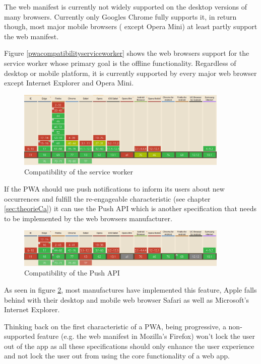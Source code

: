 The web manifest is currently not widely supported on the desktop versions of many browsers. Currently only Googles Chrome fully supports it, in return though, most major mobile browsers ( except Opera Mini) at least partly support the web manifest. 

Figure \ref{pwacompatibilityserviceworker} shows the web browsers support for the service worker whose primary goal is the offline functionality. Regardless of desktop or mobile platform, it is currently supported by every major web browser except Internet Explorer and Opera Mini.

\begin{figure}[htbp] 
	\centering
	\includegraphics[width=0.9\textwidth]{Assets/chapter_pwa/serviceworkersupport.PNG}
	\caption{Compatibility of the service worker}
	\label{fig:pwacompatibilityserviceworker}
\end{figure}

If the PWA should use push notifications to inform its users about new occurrences and fulfill the re-engageable characteristic (see chapter \ref{sec:theorieCa}) it can use the Push API which is another specification that needs to be implemented by the web browsers manufacturer.

\begin{figure}[htbp] 
	\centering
	\includegraphics[width=0.9\textwidth]{Assets/chapter_pwa/pushapisupport.PNG}
	\caption{Compatibility of the Push API}
	\label{fig:pwacompatibilitypushapi}
\end{figure}

As seen in figure \ref{fig:pwacompatibilitypushapi}, most manufactures have implemented this feature, Apple falls behind with their desktop and mobile web browser Safari as well as Microsoft’s Internet Explorer.

Thinking back on the first characteristic of a PWA, being progressive, a non-supported feature (e.g. the web manifest in Mozilla's Firefox) won’t lock the user out of the app as all these specifications should only enhance the user experience and not lock the user out from using the core functionality of a web app.